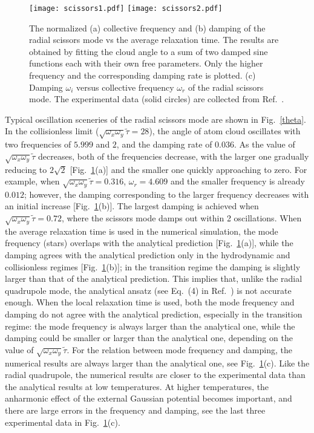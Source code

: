 \begin{figure}[t]
	\center
	\texttt{[image: scissors1.pdf]} 
	\texttt{[image: scissors2.pdf]} 
	\caption[The normalized (a) collective frequency and (b) damping of the radial scissors mode vs the average relaxation time. (c) Damping $\omega_i$ vs collective frequency $\omega_r$ of the radial scissors mode.]
	{The normalized (a) collective frequency and (b) damping of the radial scissors mode vs the average relaxation time. The results are obtained by fitting the cloud angle to a sum of two damped sine functions each with their own free parameters. Only the higher frequency and the corresponding damping rate is plotted. (c) Damping $\omega_i$ versus collective frequency $\omega_r$ of the radial scissors mode. The experimental data (solid circles) are collected from Ref.~\cite{Wright2007}.}
	\label{fig_scissors}
\end{figure}


Typical oscillation sceneries of the radial scissors mode are shown in Fig.~\ref{theta}. In the collisionless limit ($\sqrt{\omega_x\omega_y}\widetilde{\tau}=28$), the angle of atom cloud oscillates with two frequencies of $5.999$ and $2$, and the damping rate of $0.036$. As the value of $\sqrt{\omega_x\omega_y}\widetilde{\tau}$ decreases, both of the frequencies decrease, with the larger one gradually reducing to $2\sqrt{2}$ [Fig.~\ref{fig_scissors}(a)] and the smaller one quickly approaching to zero. For example, when $\sqrt{\omega_x\omega_y}\widetilde{\tau}=0.316$, $\omega_r=4.609$ and the smaller frequency is already $0.012$; however, the damping corresponding to the larger frequency decreases with an initial increase  [Fig.~\ref{fig_scissors}(b)]. The largest damping is achieved when $\sqrt{\omega_x\omega_y}\widetilde{\tau}=0.72$, where the scissors mode damps out within 2 oscillations. When the average relaxation time is used in the numerical simulation, the mode frequency (stars) overlaps with the analytical prediction [Fig.~\ref{fig_scissors}(a)], while the damping agrees with the analytical prediction only in the hydrodynamic and collisionless regimes [Fig.~\ref{fig_scissors}(b)]; in the transition regime the damping is slightly larger than that of the analytical prediction. This implies that, unlike the radial quadrupole mode, the analytical ansatz (see Eq.~(4) in Ref.~\cite{Bruun2007}) is not accurate enough. When the local relaxation time is used, both the mode frequency and damping do not agree with the analytical prediction, especially in the transition regime: the mode frequency is always larger than the analytical one, while the damping could be smaller or larger than the analytical one, depending on the value of $\sqrt{\omega_x\omega_y}\widetilde{\tau}$. For the relation between mode frequency and damping, the numerical results are always larger than the analytical one, see Fig.~\ref{fig_scissors}(c). Like the radial quadrupole, the numerical results are closer to the experimental data than the analytical results at low temperatures. At higher temperatures, the anharmonic effect of the external Gaussian potential becomes important, and there are large errors in the frequency and damping, see the last three experimental data in Fig.~\ref{fig_scissors}(c).



